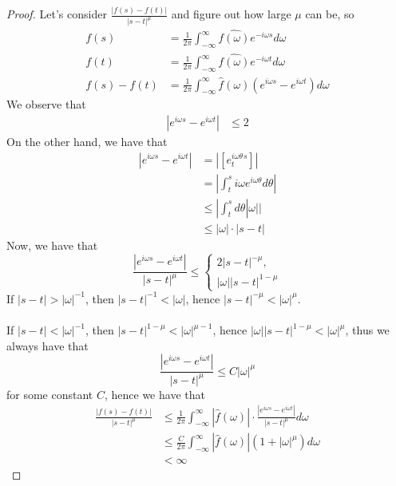 \documentclass{article}
\begin{document}
\begin{proof}
    Let's consider $\frac{|f(s) - f(t)|}{|s - t|^\mu}$ and figure out how large $\mu$ can be, so
    \begin{align*}
        f(s) &= \frac{1}{2\pi} \int_{-\infty}^\infty \widehat{f(\omega)} e^{-i\omega s} d\omega\\
        f(t) &= \frac{1}{2\pi} \int_{-\infty}^\infty \widehat{f(\omega)} e^{-i\omega t} d\omega\\
        f(s) - f(t) &= \frac{1}{2\pi} \int_{-\infty}^\infty \widehat{f}(\omega) (e^{i\omega s} - e^{i\omega t}) d\omega
    \end{align*}
    We observe that
    \begin{align*}
        |e^{i\omega s} - e^{i \omega t}| &\leq 2 \tag*{By Triangle's Inequality, this is best bound when $\omega >> 0$} 
    \end{align*}
    On the other hand, we have that
    \begin{align*}
        |e^{i\omega s} - e^{i \omega t}|  &= |[e^{i \omega \theta}_t^s]|\\
        &= |\int_{t}^s i \omega e^{i \omega \theta} d\theta|\\
        &\leq |\int_t^s d\theta |\omega||\\
        &\leq |\omega| \cdot |s - t| \tag*{Good when $s$ is close to $t$ and $\omega$ is small}
    \end{align*}
    Now, we have that
    \[        \frac{|e^{i\omega s} - e^{i \omega t}|}{|s - t|^\mu} \leq \begin{cases}
            2|s - t|^{-\mu},\\
            |\omega| |s - t|^{1-\mu}
        \end{cases}\]
    If $|s - t| > |\omega|^{-1}$, then $|s - t|^{-1} < |\omega|$, hence $|s - t|^{-\mu} < |\omega|^\mu$.\\\\
    If $|s - t| < |\omega|^{-1}$, then $|s - t|^{1- \mu} < |\omega|^{\mu - 1}$, hence $|\omega| |s - t|^{1-\mu} < |\omega|^\mu$, thus we always have that
    \[ \frac{|e^{i\omega s} - e^{i \omega t}|}{|s - t|^\mu} \leq  C |\omega|^\mu\]
    for some constant $C$, hence we have that
    \begin{align*}
    \frac{|f(s) - f(t)|}{|s - t|^\mu} &\leq \frac{1}{2\pi} \int_{-\infty}^\infty |\widehat{f}(\omega)| \cdot \frac{|e^{i\omega s} - e^{i\omega t}|}{|s - t|^\mu} d\omega\\
    &\leq \frac{C}{2\pi} \int_{-\infty}^\infty |\widehat{f}(\omega)| (1 + |\omega|^\mu) d\omega\\
    &< \infty
    \end{align*}
\end{proof}
\end{document}
